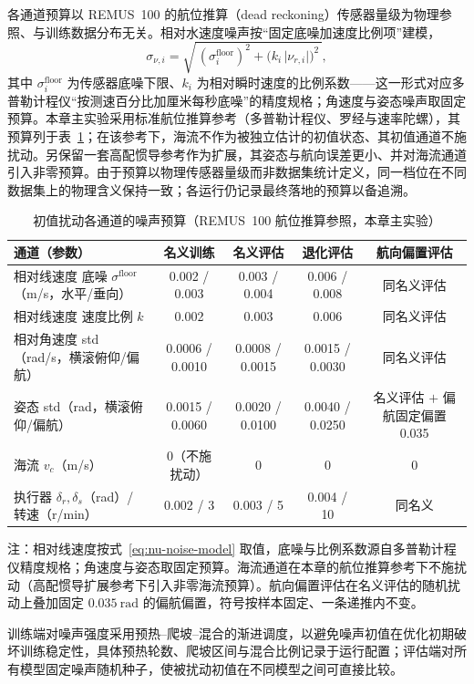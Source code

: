 各通道预算以 REMUS~100 的航位推算（dead reckoning）传感器量级为物理参照、与训练数据分布无关。相对水速度噪声按“固定底噪加速度比例项”建模，
\begin{equation}
  \sigma_{\nu,i}=\sqrt{\,(\sigma_i^{\mathrm{floor}})^2+\big(k_i\,\lvert\nu_{r,i}\rvert\big)^2\,},
  \label{eq:nu-noise-model}
\end{equation}
其中 \(\sigma_i^{\mathrm{floor}}\) 为传感器底噪下限、\(k_i\) 为相对瞬时速度的比例系数——这一形式对应多普勒计程仪“按测速百分比加厘米每秒底噪”的精度规格；角速度与姿态噪声取固定预算。本章主实验采用标准航位推算参考（多普勒计程仪、罗经与速率陀螺），其预算列于表~\ref{tab:noise-budget}；在该参考下，海流不作为被独立估计的初值状态、其初值通道不施扰动。另保留一套高配惯导参考作为扩展，其姿态与航向误差更小、并对海流通道引入非零预算。由于预算以物理传感器量级而非数据集统计定义，同一档位在不同数据集上的物理含义保持一致；各运行仍记录最终落地的预算以备追溯。

\begin{table}[htbp]
  \centering
  \caption{初值扰动各通道的噪声预算（REMUS~100 航位推算参照，本章主实验）}
  \label{tab:noise-budget}
  \small
  \begin{tabularx}{\textwidth}{>{\raggedright\arraybackslash}X cccc}
    \toprule
    通道（参数） & 名义训练 & 名义评估 & 退化评估 & 航向偏置评估 \\
    \midrule
    相对线速度 底噪 \(\sigma^{\mathrm{floor}}\)（m/s，水平/垂向）& 0.002 / 0.003 & 0.003 / 0.004 & 0.006 / 0.008 & 同名义评估 \\
    相对线速度 速度比例 \(k\) & 0.002 & 0.003 & 0.006 & 同名义评估 \\
    相对角速度 std（rad/s，横滚俯仰/偏航）& 0.0006 / 0.0010 & 0.0008 / 0.0015 & 0.0015 / 0.0030 & 同名义评估 \\
    姿态 std（rad，横滚俯仰/偏航）& 0.0015 / 0.0060 & 0.0020 / 0.0100 & 0.0040 / 0.0250 & 名义评估 \(+\) 偏航固定偏置 0.035 \\
    海流 \(v_c\)（m/s）& 0（不施扰动）& 0 & 0 & 0 \\
    执行器 \(\delta_r,\delta_s\)（rad）/ 转速（r/min）& 0.002 / 3 & 0.003 / 5 & 0.004 / 10 & 同名义 \\
    \bottomrule
  \end{tabularx}
  \par\vspace{2pt}
  \footnotesize 注：相对线速度按式~\eqref{eq:nu-noise-model} 取值，底噪与比例系数源自多普勒计程仪精度规格；角速度与姿态取固定预算。海流通道在本章的航位推算参考下不施扰动（高配惯导扩展参考下引入非零海流预算）。航向偏置评估在名义评估的随机扰动上叠加固定 \(0.035~\mathrm{rad}\) 的偏航偏置，符号按样本固定、一条递推内不变。
\end{table}

训练端对噪声强度采用预热--爬坡--混合的渐进调度，以避免噪声初值在优化初期破坏训练稳定性，具体预热轮数、爬坡区间与混合比例记录于运行配置；评估端对所有模型固定噪声随机种子，使被扰动初值在不同模型之间可直接比较。
